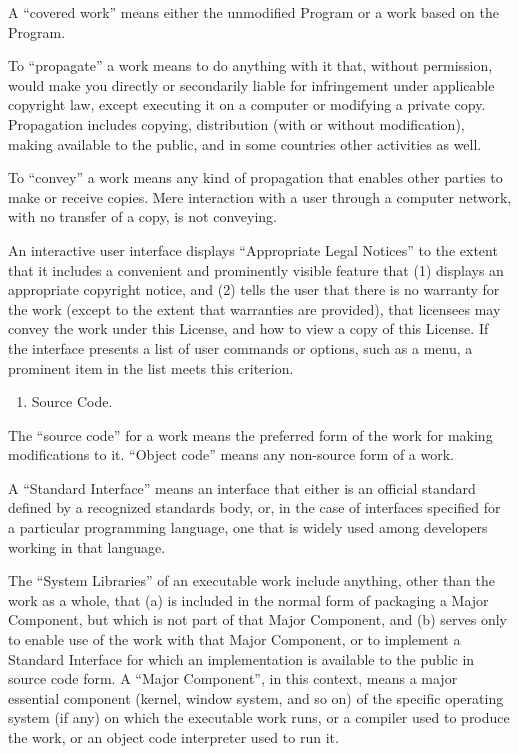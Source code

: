 \documentclass[letterpaper,10pt,english]{sphinxmanual}
\begin{document}
A “covered work” means either the unmodified Program or a work based
on the Program.

To “propagate” a work means to do anything with it that, without
permission, would make you directly or secondarily liable for
infringement under applicable copyright law, except executing it on a
computer or modifying a private copy.  Propagation includes copying,
distribution (with or without modification), making available to the
public, and in some countries other activities as well.

To “convey” a work means any kind of propagation that enables other
parties to make or receive copies.  Mere interaction with a user through
a computer network, with no transfer of a copy, is not conveying.

An interactive user interface displays “Appropriate Legal Notices”
to the extent that it includes a convenient and prominently visible
feature that (1) displays an appropriate copyright notice, and (2)
tells the user that there is no warranty for the work (except to the
extent that warranties are provided), that licensees may convey the
work under this License, and how to view a copy of this License.  If
the interface presents a list of user commands or options, such as a
menu, a prominent item in the list meets this criterion.
\begin{enumerate}
%
\item {} 
Source Code.

\end{enumerate}

The “source code” for a work means the preferred form of the work
for making modifications to it.  “Object code” means any non-source
form of a work.

A “Standard Interface” means an interface that either is an official
standard defined by a recognized standards body, or, in the case of
interfaces specified for a particular programming language, one that
is widely used among developers working in that language.

The “System Libraries” of an executable work include anything, other
than the work as a whole, that (a) is included in the normal form of
packaging a Major Component, but which is not part of that Major
Component, and (b) serves only to enable use of the work with that
Major Component, or to implement a Standard Interface for which an
implementation is available to the public in source code form.  A
“Major Component”, in this context, means a major essential component
(kernel, window system, and so on) of the specific operating system
(if any) on which the executable work runs, or a compiler used to
produce the work, or an object code interpreter used to run it.
\end{document}

